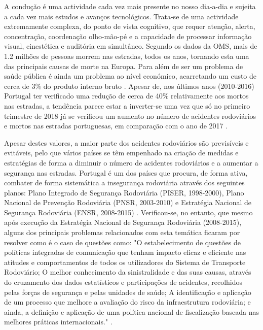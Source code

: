 \documentclass[a4paper,10pt]{texRel}
\begin{document}
A condução é uma actividade cada vez mais presente no nosso dia-a-dia e sujeita a cada vez mais estudos e avanços tecnológicos. Trata-se de uma actividade extremamente complexa, do ponto de vista cognitivo, que requer atenção, alerta, concentração, coordenação olho-mão-pé e a capacidade de processar informação visual, cinestética e auditória em simultâneo. Segundo os dados da OMS, mais de 1.2 milhões de pessoas morrem nas estradas, todos os anos, tornando esta uma das principais causas de morte na Europa. Para além de ser um problema de saúde pública é ainda um problema ao nível económico, acarretando um custo de cerca de 3\% do produto interno bruto \cite{Geneva}. Apesar de, nos últimos anos (2010-2016) Portugal ter verificado uma redução de cerca de 40\% relativamente aos mortos nas estradas, a tendência parece estar a inverter-se uma vez que só no primeiro trimestre de 2018 já se verificou um aumento no número de acidentes rodoviários e mortos nas estradas portuguesas, em comparação com o ano de 2017 \cite{PT1}. 

Apesar destes valores, a maior parte dos acidentes rodoviários são previsíveis e evitáveis, pelo que vários países se têm empenhado na criação de medidas e estratégias de forma a diminuir o número de acidentes rodoviários e a aumentar a segurança nas estradas. Portugal é um dos países que procura, de forma ativa, combater de forma sistemática a insegurança rodoviária através dos seguintes planos: Plano Integrado de Segurança Rodoviária (PISER, 1998-2000), Plano Nacional de Prevenção Rodoviária (PNSR, 2003-2010) e Estratégia Nacional de Segurança Rodoviária (ENSR, 2008-2015) \cite{DR}.
Verificou-se, no entanto, que mesmo após execução da Estratégia Nacional de Segurança Rodoviária (2008-2015), alguns dos principais problemas relacionados com esta temática ficaram por resolver como é o caso de questões como: "O estabelecimento de questões de políticas integradas de comunicação que tenham impacto eficaz e eficiente nas atitudes e comportamentos de todos os utilizadores do Sistema de Transporte Rodoviário; 
O melhor conhecimento da sinistralidade e das suas causas, através do cruzamento dos dados estatísticos e participações de acidentes, recolhidos pelas forças de segurança e pelas unidades de saúde; 
A identificação e aplicação de um processo que melhore a avaliação do risco da infraestrutura rodoviária; e ainda, a definição e aplicação de uma política nacional de fiscalização baseada nas melhores práticas internacionais." \cite{DR}.
\end{document}
